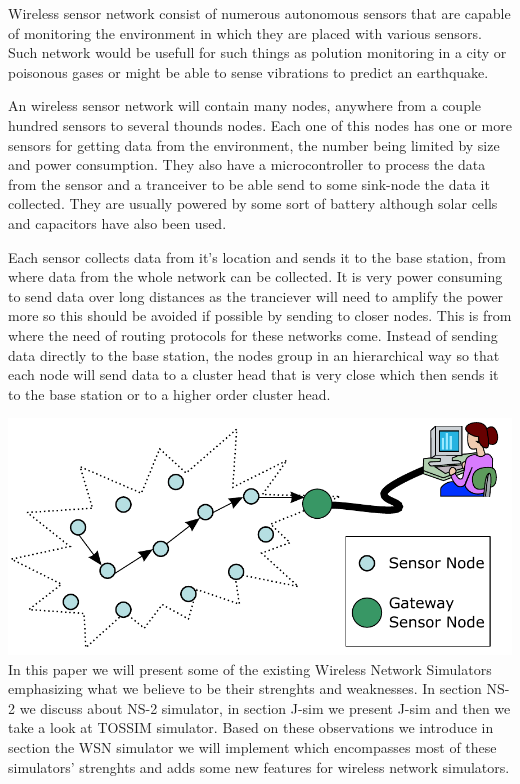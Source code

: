 
Wireless sensor network consist of numerous autonomous sensors that are
capable of monitoring the environment in which they are placed with various
sensors. Such network would be usefull for such things as polution monitoring
in a city or poisonous gases or might be able to sense vibrations to predict
an earthquake. 

An wireless sensor network will contain many nodes, anywhere from a couple
hundred sensors to several thounds nodes. Each one of this nodes has one or
more sensors for getting data from the environment, the number being limited
by size and power consumption. They also have a microcontroller to process the
data from the sensor and a tranceiver to be able send to some sink-node the
data it collected. They are usually powered by some sort of battery although
solar cells and capacitors have also been used.

Each sensor collects data from it's location and sends it to the base station,
from where data from the whole network can be collected. It is very power
consuming to send data over long distances as the tranciever will need to
amplify the power more so this should be avoided if possible by sending to
closer nodes. This is from where the need of routing protocols for these
networks come. Instead of sending data directly to the base station, the nodes
group in an hierarchical way so that each node will send data to a cluster
head that is very close which then sends it to the base station or to a higher
order cluster head.

\includegraphics{img/WSN.pdf}
\\
In this paper we will present some of the existing Wireless Network
Simulators emphasizing what we believe to be their strenghts and weaknesses. 
In section NS-2 we discuss about NS-2 simulator, in section J-sim we present
J-sim and then we take a look at TOSSIM simulator. Based on these observations
we introduce in section \codename  the WSN simulator we will implement which
encompasses most of these simulators' strenghts and adds some new features
for wireless network simulators.
